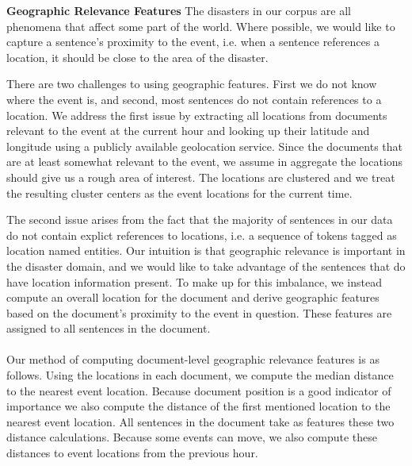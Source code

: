 \textbf{Geographic Relevance Features}
The disasters in our corpus are all phenomena that
affect some part of the world. 
Where possible, we would like to capture a sentence's proximity to the event,
i.e. when a sentence references a location, it should be close to the 
area of the disaster. 

There are two challenges to using geographic features. First we do not 
know where the event is, and second, most sentences do not contain references
to a location.
We address the first issue by extracting all locations from 
documents relevant to the event at the
current hour and looking up their latitude and 
longitude using a publicly available geolocation service. 
Since the documents that are at least somewhat relevant to the event,
we assume in aggregate the locations should give us a rough area of interest.
The locations are clustered %
and we treat the resulting cluster centers
as the event locations for the current time.


The second issue arises from the fact that the majority of sentences in our 
data do not contain explict references to locations, i.e. a sequence of tokens
tagged as location named entities.   
Our intuition is that geographic relevance is important in the disaster
domain, and we would like to take advantage of the sentences that do have 
location information present. To make up for this imbalance, we  
instead compute an overall location for the document and derive 
geographic features based on the document's proximity to the event in 
question.
These features are assigned to all sentences in the document.\\\\
Our method of computing document-level geographic relevance features is as 
follows.
Using the locations in each document, we compute the median distance to the 
nearest event location. Because document position is a good indicator 
of importance we also compute the distance of the first mentioned
location to the nearest event location. All sentences in the document take
as features these two distance calculations.
Because some events can move, we also
compute these distances to event locations from the previous hour.


